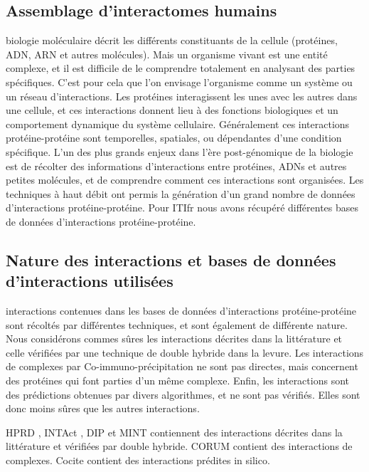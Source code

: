		\subsection{\textcolor{green!60!black}{Assemblage d'interactomes humains}}
			 biologie moléculaire décrit les différents constituants de la cellule (protéines, \acs{ADN}, \acs{ARN} et autres molécules). Mais un organisme vivant est une entité complexe, et il est difficile de le comprendre totalement en analysant des parties spécifiques. C'est pour cela que l'on envisage l'organisme comme un système ou un réseau d'interactions.
			Les protéines interagissent les unes avec les autres dans une cellule, et ces interactions donnent lieu à des fonctions biologiques et un comportement dynamique du système cellulaire. Généralement ces interactions protéine-protéine sont temporelles, spatiales, ou dépendantes d'une condition spécifique.
			L'un des plus grands enjeux dans l'ère post-génomique de la biologie est de récolter des informations d'interactions entre protéines, \acsp{ADN} et autres petites molécules, et de comprendre comment ces interactions sont organisées.
			Les techniques à haut débit ont permis la génération d'un grand nombre de données d'interactions protéine-protéine.
			Pour \acs{ITIfr} nous avons récupéré différentes bases de données d'interactions protéine-protéine.

		\subsection{\textcolor{green!60!black}{Nature des interactions et bases de données d'interactions utilisées}}
			 interactions contenues dans les bases de données d'interactions protéine-protéine sont récoltés par différentes techniques, et sont également de différente nature.
			Nous considérons commes sûres les interactions décrites dans la littérature et celle vérifiées par une technique de double hybride dans la levure.
			Les interactions de complexes par Co-immuno-précipitation ne sont pas directes, mais concernent des protéines qui font parties d'un même complexe.
			Enfin, les interactions sont des prédictions obtenues par divers algorithmes, et ne sont pas vérifiés.
			Elles sont donc moins sûres que les autres interactions. 

			HPRD \citep{Prasad2009}, INTAct \citep{Aranda2010}, DIP \citep{Xenarios2000} et MINT \citep{Zanzoni2002} contiennent des interactions décrites dans la littérature et vérifiées par double hybride.
			CORUM \citep{Ruepp2008} contient des interactions de complexes.
			Cocite \citep{Ramani2005} contient des interactions prédites in silico.


